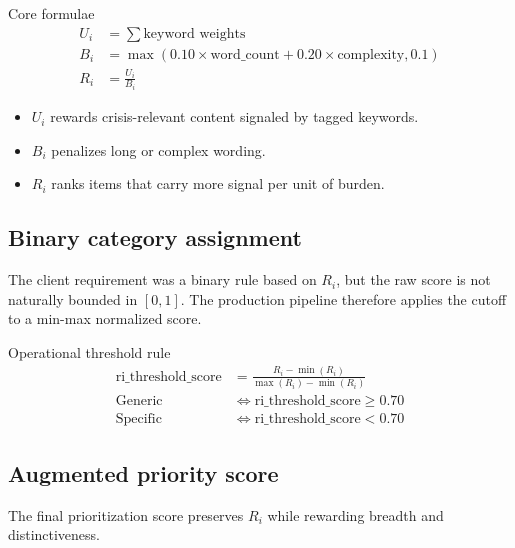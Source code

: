 \documentclass[12pt]{article}
\begin{document}
\begin{psidbox}{Core formulae}
\begin{align*}
U_i &= \sum \text{keyword weights} \\
B_i &= \max(0.10 \times \text{word\_count} + 0.20 \times \text{complexity}, 0.1) \\
R_i &= \frac{U_i}{B_i}
\end{align*}

\begin{itemize}
\item $U_i$ rewards crisis-relevant content signaled by tagged keywords.
\item $B_i$ penalizes long or complex wording.
\item $R_i$ ranks items that carry more signal per unit of burden.
\end{itemize}
\end{psidbox}

\subsection{Binary category assignment}

The client requirement was a binary rule based on $R_i$, but the raw score is not naturally bounded in $[0, 1]$. The production pipeline therefore applies the cutoff to a min-max normalized score.

\begin{psidbox}{Operational threshold rule}
\begin{align*}
\text{ri\_threshold\_score} &= \frac{R_i - \min(R_i)}{\max(R_i) - \min(R_i)} \\
\text{Generic} &\iff \text{ri\_threshold\_score} \geq 0.70 \\
\text{Specific} &\iff \text{ri\_threshold\_score} < 0.70
\end{align*}
\end{psidbox}

\subsection{Augmented priority score}

The final prioritization score preserves $R_i$ while rewarding breadth and distinctiveness.
\end{document}

